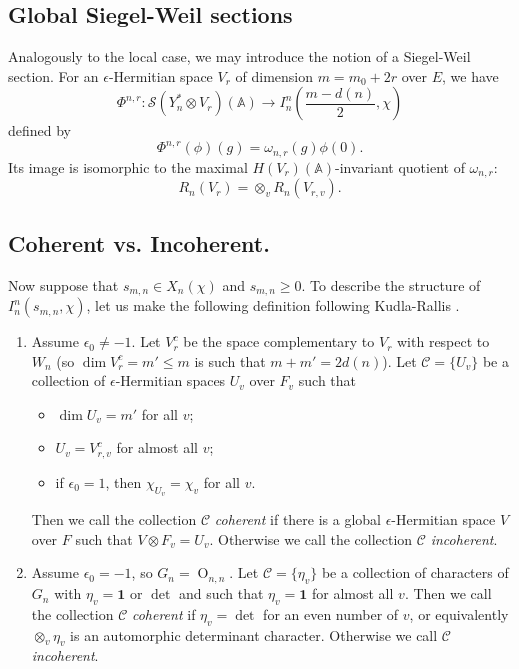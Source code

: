 \documentclass[10pt]{amsart}
\theoremstyle{plain}
\numberwithin{equation}{section}
\begin{document}
 \subsection{\bf Global Siegel-Weil sections}
Analogously to the local case, we may  introduce the notion of a
Siegel-Weil section.
 For an $\epsilon$-Hermitian space $V_r$ of dimension $m=m_0+2r$ over $E$, we have  
 \[  \Phi^{n,r}: \mathcal{S}(Y_n^* \otimes V_r)({\mathbb{A}})\longrightarrow
 I^n_n(\frac{m - d(n)}{2},\chi) \]
 defined by
 \[  \Phi^{n,r}(\phi)(g) = \omega_{n,r}(g)\phi(0). \]
 Its image is isomorphic to the maximal $H(V_r)({\mathbb{A}})$-invariant quotient
 of $\omega_{n,r}$:
 \[  R_n(V_r)   = \otimes_v R_n(V_{r, v}). \]
 \vskip 5pt
 
 
 \subsection{\bf  Coherent vs. Incoherent.}
 Now suppose that $s_{m,n} \in X_n(\chi)$ and $s_{m,n} \geq 0$. 
 To describe the structure of $I^n_n(s_{m,n},\chi)$, let us make the
following definition following Kudla-Rallis \cite{KR5}.
\vskip 5pt

\begin{enumerate}[(1)]
\item Assume $\epsilon_0\neq -1$. Let $V_r^c$ be the space
  complementary to $V_r$ with respect to $W_n$ (so $\dim V_r^c=m' \leq m$ is such that
  $m+m'=2d(n)$). Let
  $\mathcal{C}=\{U_v\}$ be a collection of $\epsilon$-Hermitian spaces
  $U_v$ over $F_v$ such that
\begin{itemize}
\item $\dim U_v=m'$ for all $v$;
 \item $U_v= V_{r,v}^c$ for almost all $v$;
\item if $\epsilon_0 =1$, then $\chi_{U_v}=\chi_v$ for all $v$.
\end{itemize}
Then we call the collection $\mathcal{C}$ {\em coherent} if there is
a global $\epsilon$-Hermitian space $V$ over $F$ such that $V\otimes
F_v=U_v$. Otherwise we call the collection $\mathcal{C}$ {\em incoherent}.

\vskip 10pt

\item Assume $\epsilon_0=-1$, so $G_n={\operatorname{O}}_{n,n}$. Let $\mathcal{C}=\{\eta_v\}$ be a
  collection of  characters of $G_n$ with $\eta_v =  \mathbf{1}$ or $\det$ and such that
  $\eta_v=\mathbf{1}$ for almost all $v$. Then we call the collection
  $\mathcal{C}$ {\em coherent} if $\eta_v=\det$ for an even number of
  $v$, or equivalently $\otimes_v\eta_v$ is an automorphic determinant
  character. Otherwise we call $\mathcal{C}$ {\em incoherent}.
\end{enumerate}
\end{document}
